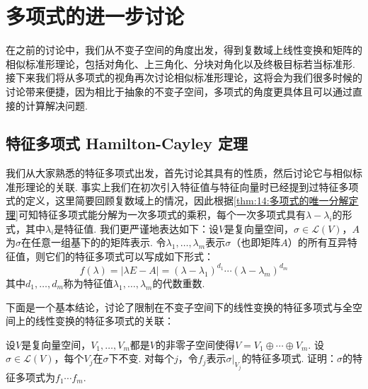 \chapter{多项式的进一步讨论}

在之前的讨论中，我们从不变子空间的角度出发，得到复数域上线性变换和矩阵的相似标准形理论，包括对角化、上三角化、分块对角化以及终极目标若当标准形. 接下来我们将从多项式的视角再次讨论相似标准形理论，这将会为我们很多时候的讨论带来便捷，因为相比于抽象的不变子空间，多项式的角度更具体且可以通过直接的计算解决问题.

\section{特征多项式 \quad Hamilton-Cayley 定理}

我们从大家熟悉的特征多项式出发，首先讨论其具有的性质，然后讨论它与相似标准形理论的关联. 事实上我们在初次引入特征值与特征向量时已经提到过特征多项式的定义，这里简要回顾复数域上的情况，因此根据\autoref{thm:14:多项式的唯一分解定理}可知特征多项式能分解为一次多项式的乘积，每个一次多项式具有$\lambda-\lambda_i$的形式，其中$\lambda_i$是特征值. 我们更严谨地表达如下：设$V$是复向量空间，$\sigma\in \mathcal{L}(V)$，$A$为$\sigma$在任意一组基下的的矩阵表示. 令$\lambda_1,\ldots,\lambda_m$表示$\sigma$（也即矩阵$A$）的所有互异特征值，则它们的特征多项式可以写成如下形式：
\begin{equation}\label{eq:18:特征多项式}
    f(\lambda)=|\lambda E-A|=(\lambda-\lambda_1)^{d_1}\cdots(\lambda-\lambda_m)^{d_m}
\end{equation}
其中$d_1,\ldots,d_m$称为特征值$\lambda_1,\ldots,\lambda_m$的代数重数.

下面是一个基本结论，讨论了限制在不变子空间下的线性变换的特征多项式与全空间上的线性变换的特征多项式的关联：
\begin{theorem} \label{thm:18:特征多项式与不变子空间}
    设$V$是复向量空间，$V_1,\ldots,V_m$都是$V$的非零子空间使得$V=V_1\oplus\cdots\oplus V_m$. 设$\sigma\in \mathcal{L}(V)$，每个$V_j$在$\sigma$下不变. 对每个$j$，令$f_j$表示$\sigma\vert_{V_j}$的特征多项式. 证明：$\sigma$的特征多项式为$f_1\cdots f_m$.
\end{theorem}

